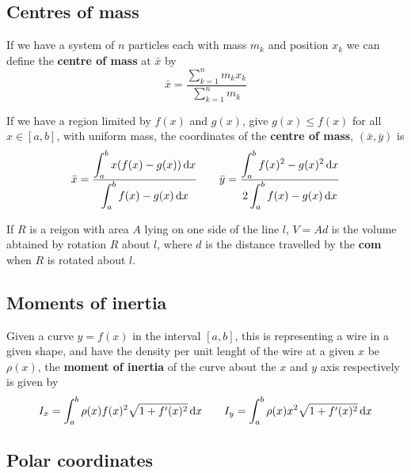 \documentclass[../Year1/Year1.tex]{subfiles}
\begin{document}
\subsection{Centres of mass}

\begin{theorem}
    If we have a system of $n$ particles each with mass $m_k$ and position $x_k$ we can define the \textbf{centre of mass} at $\bar{x}$ by \[
        \bar{x} = \frac{\displaystyle\sum_{k=1}^nm_kx_k}{\displaystyle\sum_{k=1}^nm_k}
    \]
\end{theorem}

\begin{theorem}
    If we have a region limited by $f(x)$ and $g(x)$, give $g(x)\leq f(x)$ for all $x\in[a,b]$, with uniform mass, the coordinates of the \textbf{centre of mass}, $(\bar{x},\bar{y})$ is \[
        \bar{x} = \frac{\displaystyle\intd{a}{b}{x(f(x)-g(x))}{x}}{\displaystyle\intd{a}{b}{f(x)-g(x)}{x}} \qquad
        \bar{y} = \frac{\displaystyle\intd{a}{b}{f(x)^2-g(x)^2}{x}}{\displaystyle2\intd{a}{b}{f(x)-g(x)}{x}}
    \]
\end{theorem}

\begin{theorem}
    If $R$ is a reigon with area $A$ lying on one side of the line $l$, $V=Ad$ is the volume abtained by rotation $R$ about $l$, where $d$ is the distance travelled by the \textbf{com} when $R$ is rotated about $l$.
\end{theorem}

\subsection{Moments of inertia}

\begin{theorem}
    Given a curve $y=f(x)$ in the interval $[a,b]$, this is representing a wire in a given shape, and have the density per unit lenght of the wire at a given $x$ be $\rho(x)$, the \textbf{moment of inertia} of the curve about the $x$ and $y$ axis respectively is given by \[
        I_x = \intd{a}{b}{\rho(x)f(x)^2\sqrt{1+f'(x)^2}}{x} \qquad I_y = \intd{a}{b}{\rho(x)x^2\sqrt{1+f'(x)^2}}{x}
    \]
\end{theorem}

\subsection{Polar coordinates}
\end{document}
